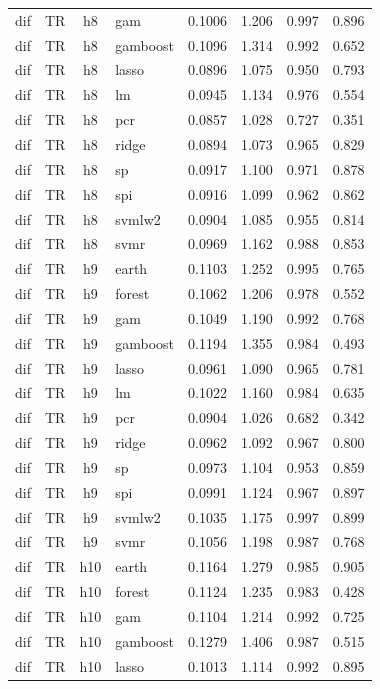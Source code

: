 \begin{ThreePartTable}
\begin{longtable}[t]{llclcccc}
dif & TR & h8 & gam & 0.1006 & 1.206 & 0.997 & 0.896\\
dif & TR & h8 & gamboost & 0.1096 & 1.314 & 0.992 & 0.652\\
dif & TR & h8 & lasso & 0.0896 & 1.075 & 0.950 & 0.793\\
dif & TR & h8 & lm & 0.0945 & 1.134 & 0.976 & 0.554\\
dif & TR & h8 & pcr & 0.0857 & 1.028 & 0.727 & 0.351\\
dif & TR & h8 & ridge & 0.0894 & 1.073 & 0.965 & 0.829\\
dif & TR & h8 & sp & 0.0917 & 1.100 & 0.971 & 0.878\\
dif & TR & h8 & spi & 0.0916 & 1.099 & 0.962 & 0.862\\
dif & TR & h8 & svmlw2 & 0.0904 & 1.085 & 0.955 & 0.814\\
dif & TR & h8 & svmr & 0.0969 & 1.162 & 0.988 & 0.853\\
\addlinespace
dif & TR & h9 & earth & 0.1103 & 1.252 & 0.995 & 0.765\\
dif & TR & h9 & forest & 0.1062 & 1.206 & 0.978 & 0.552\\
dif & TR & h9 & gam & 0.1049 & 1.190 & 0.992 & 0.768\\
dif & TR & h9 & gamboost & 0.1194 & 1.355 & 0.984 & 0.493\\
dif & TR & h9 & lasso & 0.0961 & 1.090 & 0.965 & 0.781\\
dif & TR & h9 & lm & 0.1022 & 1.160 & 0.984 & 0.635\\
dif & TR & h9 & pcr & 0.0904 & 1.026 & 0.682 & 0.342\\
dif & TR & h9 & ridge & 0.0962 & 1.092 & 0.967 & 0.800\\
dif & TR & h9 & sp & 0.0973 & 1.104 & 0.953 & 0.859\\
dif & TR & h9 & spi & 0.0991 & 1.124 & 0.967 & 0.897\\
dif & TR & h9 & svmlw2 & 0.1035 & 1.175 & 0.997 & 0.899\\
dif & TR & h9 & svmr & 0.1056 & 1.198 & 0.987 & 0.768\\
\addlinespace
dif & TR & h10 & earth & 0.1164 & 1.279 & 0.985 & 0.905\\
dif & TR & h10 & forest & 0.1124 & 1.235 & 0.983 & 0.428\\
dif & TR & h10 & gam & 0.1104 & 1.214 & 0.992 & 0.725\\
dif & TR & h10 & gamboost & 0.1279 & 1.406 & 0.987 & 0.515\\
dif & TR & h10 & lasso & 0.1013 & 1.114 & 0.992 & 0.895\\

\end{longtable}
\end{ThreePartTable}
